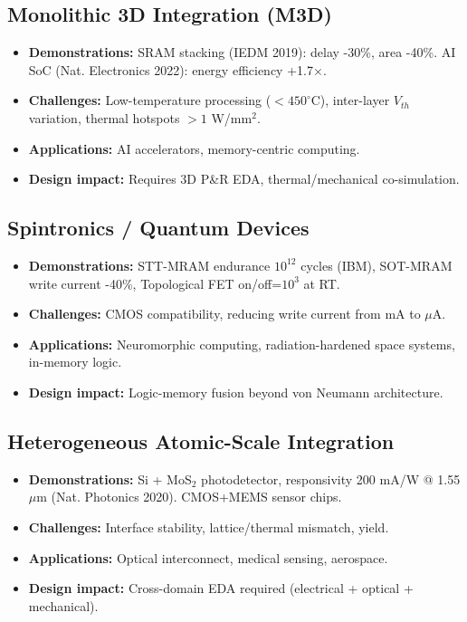 \documentclass[conference]{IEEEtran}
\begin{document}
\subsection{Monolithic 3D Integration (M3D)}
\begin{itemize}
  \item \textbf{Demonstrations:} SRAM stacking (IEDM 2019): delay -30\%, area -40\%. AI SoC (Nat. Electronics 2022): energy efficiency +1.7$\times$.  
  \item \textbf{Challenges:} Low-temperature processing ($<450^\circ$C), inter-layer $V_{th}$ variation, thermal hotspots $>1$ W/mm$^2$.  
  \item \textbf{Applications:} AI accelerators, memory-centric computing.  
  \item \textbf{Design impact:} Requires 3D P\&R EDA, thermal/mechanical co-simulation.  
\end{itemize}

\subsection{Spintronics / Quantum Devices}
\begin{itemize}
  \item \textbf{Demonstrations:} STT-MRAM endurance $10^{12}$ cycles (IBM), SOT-MRAM write current -40\%, Topological FET on/off=$10^3$ at RT.  
  \item \textbf{Challenges:} CMOS compatibility, reducing write current from mA to $\mu$A.  
  \item \textbf{Applications:} Neuromorphic computing, radiation-hardened space systems, in-memory logic.  
  \item \textbf{Design impact:} Logic-memory fusion beyond von Neumann architecture.  
\end{itemize}

\subsection{Heterogeneous Atomic-Scale Integration}
\begin{itemize}
  \item \textbf{Demonstrations:} Si + MoS$_2$ photodetector, responsivity 200 mA/W @ 1.55 $\mu$m (Nat. Photonics 2020). CMOS+MEMS sensor chips.  
  \item \textbf{Challenges:} Interface stability, lattice/thermal mismatch, yield.  
  \item \textbf{Applications:} Optical interconnect, medical sensing, aerospace.  
  \item \textbf{Design impact:} Cross-domain EDA required (electrical + optical + mechanical).  
\end{itemize}
\end{document}
